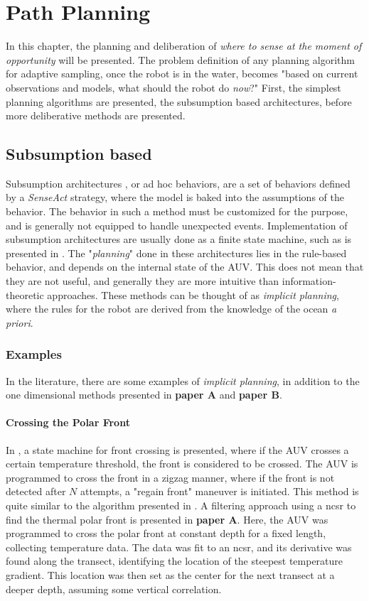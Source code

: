 \chapter{Path Planning}
\label{chapter:pathplanning}
In this chapter, the planning and deliberation of \textit{where to sense at the moment of opportunity} will be presented. The problem definition of any planning algorithm for adaptive sampling, once the robot is in the water, becomes "based on current observations and models, what should the robot do \textit{now}?" First, the simplest planning algorithms are presented, the subsumption based architectures, before more deliberative methods are presented. 

\section{Subsumption based}
Subsumption architectures \cite{fossum2019adaptive}, or ad hoc behaviors, are a set of behaviors defined by a \textit{Sense\textrightarrow Act} strategy, where the model is baked into the assumptions of the behavior. The behavior in such a method must be customized for the purpose, and is generally not equipped to handle unexpected events. Implementation of subsumption architectures are usually done as a finite state machine, such as is presented in \cite{fossum2021adaptive}. The "\textit{planning}" done in these architectures lies in the rule-based behavior, and depends on the internal state of the AUV. This does not mean that they are not useful, and generally they are more intuitive than information-theoretic approaches. These methods can be thought of as \textit{implicit planning}, where the rules for the robot are derived from the knowledge of the ocean \textit{a priori}. 


\subsection{Examples}
In the literature, there are some examples of \textit{implicit planning}, in addition to the one dimensional methods presented in \textbf{paper A} and \textbf{paper B}. 

\subsubsection*{Crossing the Polar Front}
In \cite{fossum2021adaptive}, a state machine for front crossing is presented, where if the AUV crosses a certain temperature threshold, the front is considered to be crossed. The AUV is programmed to cross the front in a zigzag manner, where if the front is not detected after $N$ attempts, a "regain front" maneuver is initiated. This method is quite similar to the algorithm presented in \cite{zhang2016autonomous}. A filtering approach using a \acrfull{ncsr} to find the thermal polar front is presented in \textbf{paper A}. Here, the AUV was programmed to cross the polar front at constant depth for a fixed length, collecting temperature data. The data was fit to an \acrshort{ncsr}, and its derivative was found along the transect, identifying the location of the steepest temperature gradient. This location was then set as the center for the next transect at a deeper depth, assuming some vertical correlation.  

